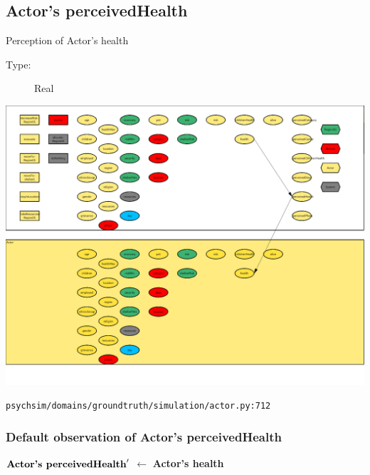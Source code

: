 \documentclass{article}%
\begin{document}
\subsection{Actor's perceivedHealth}%
\label{subsec:Actor's perceivedHealth}%
Perception of Actor's health%
\begin{description}%
\item[Type:]%
Real%
\end{description}%
\includegraphics[width=\textwidth]{images/perceivedHealthOfActor.png}%
\begin{flushleft}%
\verb|psychsim/domains/groundtruth/simulation/actor.py:712|%
\end{flushleft}%
\subsubsection{Default observation of Actor's perceivedHealth}%
\label{ssubsec:Default observation of Actor's perceivedHealth}%
\begin{flushleft}%
$\mbox{\textbf{Actor's perceivedHealth}} '$%
$\leftarrow$%
\textbf{Actor's health}%
\end{flushleft}

%
\end{document}
